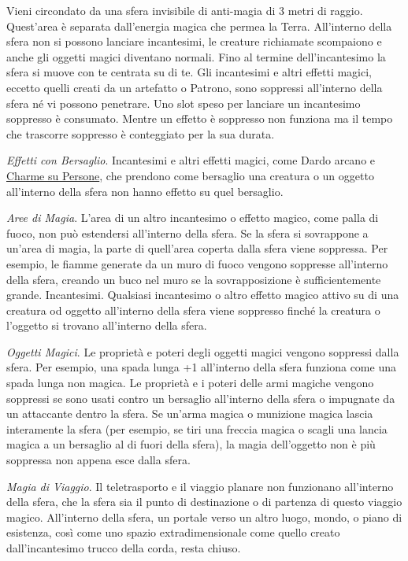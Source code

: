 \begin{multicols}{2}
Vieni circondato da una sfera invisibile di anti-magia di 3 metri di raggio. Quest'area è separata dall'energia magica che permea la Terra. All'interno della sfera non si possono lanciare incantesimi, le creature richiamate scompaiono e anche gli oggetti magici diventano normali. Fino al termine dell'incantesimo la sfera si muove con te centrata su di te. Gli incantesimi e altri effetti magici, eccetto quelli creati da un artefatto o Patrono, sono soppressi all'interno della sfera né vi possono penetrare. Uno slot speso per lanciare un incantesimo soppresso è consumato. Mentre un effetto è soppresso non funziona ma il tempo che trascorre soppresso è conteggiato per la sua durata.

\medskip

\noindent\emph{Effetti con Bersaglio}. Incantesimi e altri effetti magici, come Dardo arcano e \hyperlink{Charme su Persone}{Charme su Persone}, che prendono come bersaglio una creatura o un oggetto all'interno della sfera non hanno effetto su quel bersaglio.

\emph{Aree di Magia}. L'area di un altro incantesimo o effetto magico, come palla di fuoco, non può estendersi all'interno della sfera. Se la sfera si sovrappone a un'area di magia, la parte di quell'area coperta dalla sfera viene soppressa. Per esempio, le fiamme generate da un muro di fuoco vengono soppresse all'interno della sfera, creando un buco nel muro se la sovrapposizione è sufficientemente grande. Incantesimi. Qualsiasi incantesimo o altro effetto magico attivo su di una creatura od oggetto all'interno della sfera viene soppresso finché la creatura o l'oggetto si trovano all'interno della sfera.

\emph{Oggetti Magici}. Le proprietà e poteri degli oggetti magici vengono soppressi dalla sfera. Per esempio, una spada lunga +1 all'interno della sfera funziona come una spada lunga non magica. Le proprietà e i poteri delle armi magiche vengono soppressi se sono usati contro un bersaglio all'interno della sfera o impugnate da un attaccante dentro la sfera. Se un'arma magica o munizione magica lascia interamente la sfera (per esempio, se tiri una freccia magica o scagli una lancia magica a un bersaglio al di fuori della sfera), la magia dell'oggetto non è più soppressa non appena esce dalla sfera.

\emph{Magia di Viaggio}. Il teletrasporto e il viaggio planare non funzionano all'interno della sfera, che la sfera sia il punto di destinazione o di partenza di questo viaggio magico. All'interno della sfera, un portale verso un altro luogo, mondo, o piano di esistenza, così come uno spazio extradimensionale come quello creato dall'incantesimo trucco della corda, resta chiuso.


\end{multicols}
